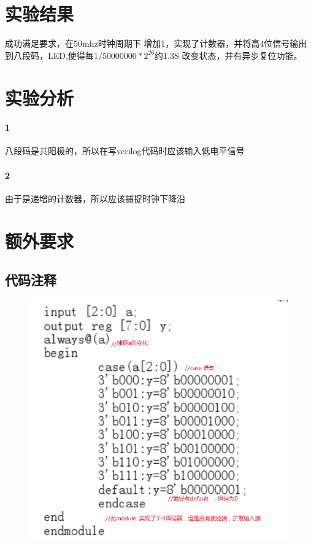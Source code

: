 \documentclass[UTF8]{ctexart}
\begin{document}
\section{实验结果}
成功满足要求，在50mhz时钟周期下 增加1，实现了计数器，并将高4位信号输出到八段码，LED,使得每$1/50000000  * 2^{26} $约1.3S 改变状态，并有异步复位功能。

\section{实验分析}
\paragraph{1}八段码是共阳极的，所以在写verilog代码时应该输入低电平信号
\paragraph{2}由于是递增的计数器，所以应该捕捉时钟下降沿

\section{额外要求}
\subsection{代码注释}
\begin{figure}[H]
  \centering
  \includegraphics[width=1\textwidth]{lab04_cd.png}
\end{figure}
\end{document}
